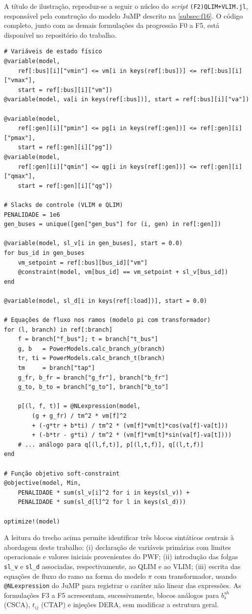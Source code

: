 \label{ap:A}

A título de ilustração, reproduz-se a seguir o núcleo do \textit{script} \verb|(F2)QLIM+VLIM.jl|, responsável pela construção do modelo JuMP descrito na \autoref{subsec:f16}. O código completo, junto com as demais formulações da progressão F0 a F5, está disponível no repositório do trabalho.

\begin{verbatim}
# Variáveis de estado físico
@variable(model,
    ref[:bus][i]["vmin"] <= vm[i in keys(ref[:bus])] <= ref[:bus][i]["vmax"],
    start = ref[:bus][i]["vm"])
@variable(model, va[i in keys(ref[:bus])], start = ref[:bus][i]["va"])

@variable(model,
    ref[:gen][i]["pmin"] <= pg[i in keys(ref[:gen])] <= ref[:gen][i]["pmax"],
    start = ref[:gen][i]["pg"])
@variable(model,
    ref[:gen][i]["qmin"] <= qg[i in keys(ref[:gen])] <= ref[:gen][i]["qmax"],
    start = ref[:gen][i]["qg"])

# Slacks de controle (VLIM e QLIM)
PENALIDADE = 1e6
gen_buses = unique([gen["gen_bus"] for (i, gen) in ref[:gen]])

@variable(model, sl_v[i in gen_buses], start = 0.0)
for bus_id in gen_buses
    vm_setpoint = ref[:bus][bus_id]["vm"]
    @constraint(model, vm[bus_id] == vm_setpoint + sl_v[bus_id])
end

@variable(model, sl_d[i in keys(ref[:load])], start = 0.0)

# Equações de fluxo nos ramos (modelo pi com transformador)
for (l, branch) in ref[:branch]
    f = branch["f_bus"]; t = branch["t_bus"]
    g, b   = PowerModels.calc_branch_y(branch)
    tr, ti = PowerModels.calc_branch_t(branch)
    tm     = branch["tap"]
    g_fr, b_fr = branch["g_fr"], branch["b_fr"]
    g_to, b_to = branch["g_to"], branch["b_to"]

    p[(l, f, t)] = @NLexpression(model,
        (g + g_fr) / tm^2 * vm[f]^2
        + (-g*tr + b*ti) / tm^2 * (vm[f]*vm[t]*cos(va[f]-va[t]))
        + (-b*tr - g*ti) / tm^2 * (vm[f]*vm[t]*sin(va[f]-va[t])))
    # ... análogo para q[(l,f,t)], p[(l,t,f)], q[(l,t,f)]
end

# Função objetivo soft-constraint
@objective(model, Min,
    PENALIDADE * sum(sl_v[i]^2 for i in keys(sl_v)) +
    PENALIDADE * sum(sl_d[l]^2 for l in keys(sl_d)))

optimize!(model)
\end{verbatim}

A leitura do trecho acima permite identificar três blocos sintáticos centrais à abordagem deste trabalho: (i) declaração de variáveis primárias com limites operacionais e valores iniciais provenientes do PWF; (ii) introdução das folgas \verb|sl_v| e \verb|sl_d| associadas, respectivamente, ao QLIM e ao VLIM; (iii) escrita das equações de fluxo do ramo na forma do modelo $\pi$ com transformador, usando \verb|@NLexpression| do JuMP para registrar o caráter não linear das expressões. As formulações F3 a F5 acrescentam, sucessivamente, blocos análogos para $b^{sh}_s$ (CSCA), $t_{ij}$ (CTAP) e injeções DERA, sem modificar a estrutura geral.
